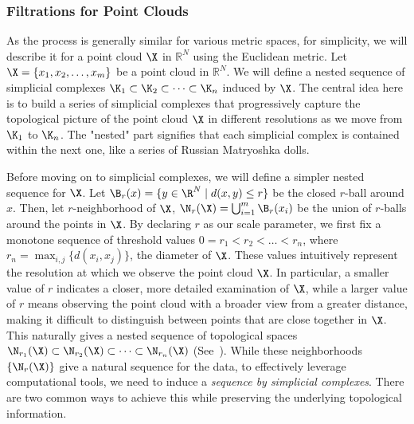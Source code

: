 \subsubsection{Filtrations for Point Clouds} \label{sec:point_cloud}
As the process is generally similar for various metric spaces, for simplicity, we will describe it for a point cloud $\X$ in $\mathbb{R}^N$ using the Euclidean metric. Let $\X = \{x_1, x_2, \dots, x_m\}$ be a point cloud in $\mathbb{R}^N$. We will define a nested sequence of simplicial complexes $\K_1 \subset \K_2 \subset \dots \subset \K_n$ induced by $\X$.  The central idea here is to build a series of simplicial complexes that progressively capture the topological picture of the point cloud $\X$ in different resolutions as we move from $\K_1$ to $\K_n$. The "nested" part signifies that each simplicial complex is contained within the next one, like a series of Russian Matryoshka dolls.

 


Before moving on to simplicial complexes, we will define a simpler nested sequence for $\X$. Let $\B_r(x)=\{y\in\R^N\mid d(x,y)\leq r\}$ be the closed $r$-ball around $x$. Then, let $r$-neighborhood of $\X$, $\N_r(\X) = \bigcup_{i=1}^m \B_r(x_i)$ be the union of $r$-balls around the points in $\X$. By declaring $r$ as our scale parameter, we first fix a monotone sequence of threshold values $0 = r_1 < r_2 < \dots < r_n$, where $r_n = \max_{i,j}\{d(x_i, x_j)\}$, the diameter of $\X$. These values intuitively represent the resolution at which we observe the point cloud $\X$. In particular, a smaller value of $r$ indicates a closer, more detailed examination of $\X$, while a larger value of $r$ means observing the point cloud with a broader view from a greater distance, making it difficult to distinguish between points that are close together in $\X$. This naturally gives a nested sequence of topological spaces $\N_{r_1}(\X) \subset \N_{r_2}(\X) \subset \dots \subset \N_{r_n}(\X)$ (See~). While these neighborhoods  $\{\N_r(\X)\}$ give a natural sequence for the data, to effectively leverage computational tools, we need to induce a \textit{sequence by simplicial complexes}. There are two common ways to achieve this while preserving the underlying topological information.







